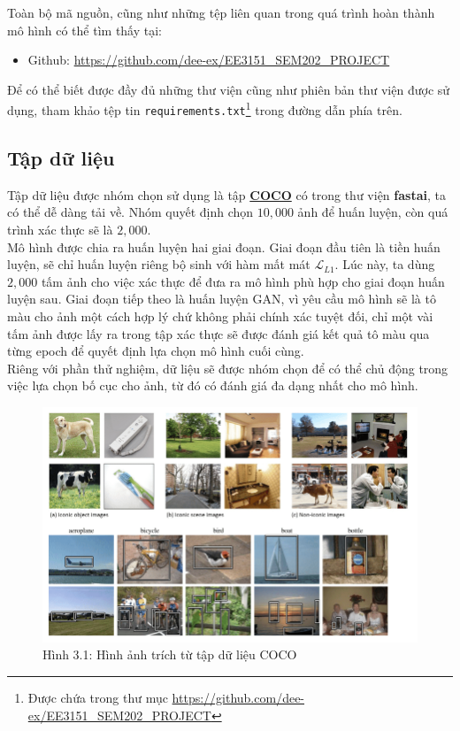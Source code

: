 \documentclass[a4paper]{article}
\begin{document}
\noindent
Toàn bộ mã nguồn, cũng như những tệp liên quan trong quá trình hoàn thành mô hình có thể tìm thấy tại:
\begin{itemize}
    \item Github: \href{https://github.com/dee-ex/EE3151\_SEM202\_PROJECT}{https://github.com/dee-ex/EE3151\_SEM202\_PROJECT}
\end{itemize}
Để có thể biết được đầy đủ những thư viện cũng như phiên bản thư viện được sử dụng, tham khảo tệp tin \texttt{requirements.txt}\footnote{Được chứa trong thư mục \href{https://github.com/dee-ex/EE3151\_SEM202\_PROJECT}{https://github.com/dee-ex/EE3151\_SEM202\_PROJECT}} trong đường dẫn phía trên.

\subsection{Tập dữ liệu}
Tập dữ liệu được nhóm chọn sử dụng là tập \href{https://cocodataset.org/#download}{\textbf{COCO}} có trong thư viện \textbf{fastai}, ta có thể dễ dàng tải về. Nhóm quyết định chọn $10,000$ ảnh để huấn luyện, còn quá trình xác thực sẽ là $2,000$.\\
Mô hình được chia ra huấn luyện hai giai đoạn. Giai đoạn đầu tiên là tiền huấn luyện, sẽ chỉ huấn luyện riêng bộ sinh với hàm mất mát $\mathcal{L}_{L1}$. Lúc này, ta dùng $2,000$ tấm ảnh cho việc xác thực để đưa ra mô hình phù hợp cho giai đoạn huấn luyện sau. Giai đoạn tiếp theo là huấn luyện GAN, vì yêu cầu mô hình sẽ là  tô màu cho ảnh một cách hợp lý chứ không phải chính xác tuyệt đối, chỉ một vài tấm ảnh được lấy ra trong tập xác thực sẽ được đánh giá kết quả tô màu qua từng epoch để quyết định lựa chọn mô hình cuối cùng.\\
Riêng với phần thử nghiệm, dữ liệu sẽ được nhóm chọn để có thể chủ động trong việc lựa chọn bố cục cho ảnh, từ đó có đánh giá đa dạng nhất cho mô hình.

\begin{figure}[h!]
\centering
\includegraphics[width=12cm]{images/3_1.png}
\caption{Hình 3.1: Hình ảnh trích từ tập dữ liệu COCO}
\end{figure}
\end{document}
